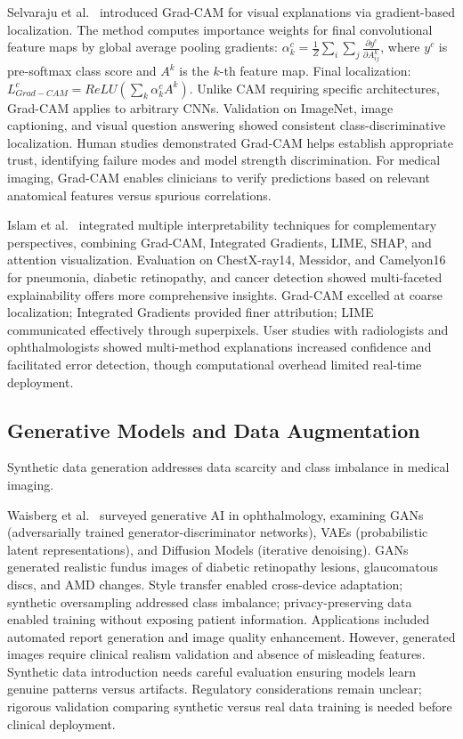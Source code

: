 Selvaraju et al.~\cite{R8} introduced Grad-CAM for visual explanations via gradient-based localization. The method computes importance weights for final convolutional feature maps by global average pooling gradients: $\alpha_k^c = \frac{1}{Z}\sum_i\sum_j \frac{\partial y^c}{\partial A_{ij}^k}$, where $y^c$ is pre-softmax class score and $A^k$ is the $k$-th feature map. Final localization: $L_{Grad-CAM}^c = ReLU(\sum_k \alpha_k^c A^k)$. Unlike CAM requiring specific architectures, Grad-CAM applies to arbitrary CNNs. Validation on ImageNet, image captioning, and visual question answering showed consistent class-discriminative localization. Human studies demonstrated Grad-CAM helps establish appropriate trust, identifying failure modes and model strength discrimination. For medical imaging, Grad-CAM enables clinicians to verify predictions based on relevant anatomical features versus spurious correlations.

Islam et al.~\cite{R4} integrated multiple interpretability techniques for complementary perspectives, combining Grad-CAM, Integrated Gradients, LIME, SHAP, and attention visualization. Evaluation on ChestX-ray14, Messidor, and Camelyon16 for pneumonia, diabetic retinopathy, and cancer detection showed multi-faceted explainability offers more comprehensive insights. Grad-CAM excelled at coarse localization; Integrated Gradients provided finer attribution; LIME communicated effectively through superpixels. User studies with radiologists and ophthalmologists showed multi-method explanations increased confidence and facilitated error detection, though computational overhead limited real-time deployment.

\subsection{Generative Models and Data Augmentation}

Synthetic data generation addresses data scarcity and class imbalance in medical imaging.

Waisberg et al.~\cite{R9} surveyed generative AI in ophthalmology, examining GANs (adversarially trained generator-discriminator networks), VAEs (probabilistic latent representations), and Diffusion Models (iterative denoising). GANs generated realistic fundus images of diabetic retinopathy lesions, glaucomatous discs, and AMD changes. Style transfer enabled cross-device adaptation; synthetic oversampling addressed class imbalance; privacy-preserving data enabled training without exposing patient information. Applications included automated report generation and image quality enhancement. However, generated images require clinical realism validation and absence of misleading features. Synthetic data introduction needs careful evaluation ensuring models learn genuine patterns versus artifacts. Regulatory considerations remain unclear; rigorous validation comparing synthetic versus real data training is needed before clinical deployment.

